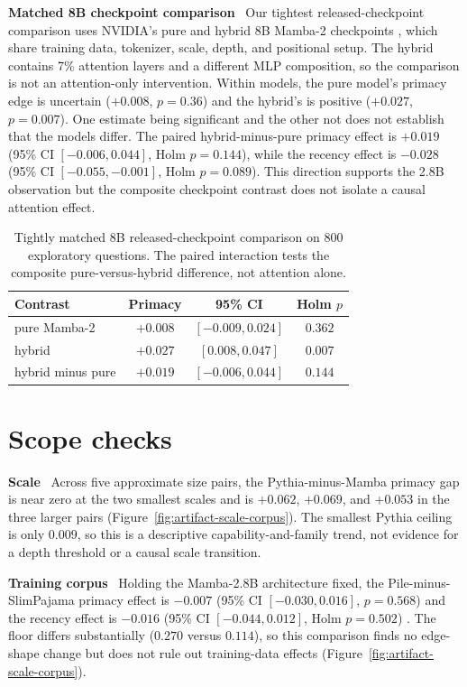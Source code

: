 \documentclass{article}
\newcommand{\runin}[1]{\par\medskip\noindent\textbf{#1}\ }
\begin{document}
\runin{Matched 8B checkpoint comparison}
Our tightest released-checkpoint comparison uses NVIDIA's pure and hybrid 8B Mamba-2 checkpoints \citep{waleffe2024empirical}, which share training data, tokenizer, scale, depth, and positional setup.
The hybrid contains 7\% attention layers and a different MLP composition, so the comparison is not an attention-only intervention.
Within models, the pure model's primacy edge is uncertain ($+0.008$, $p=0.36$) and the hybrid's is positive ($+0.027$, $p=0.007$).
One estimate being significant and the other not does not establish that the models differ.
The paired hybrid-minus-pure primacy effect is $+0.019$ (95\% CI $[-0.006,0.044]$, Holm $p=0.144$), while the recency effect is $-0.028$ (95\% CI $[-0.055,-0.001]$, Holm $p=0.089$).
This direction supports the 2.8B observation but the composite checkpoint contrast does not isolate a causal attention effect.

\begin{table}[t]
\caption{Tightly matched 8B released-checkpoint comparison on 800 exploratory questions.
The paired interaction tests the composite pure-versus-hybrid difference, not attention alone.}
\label{tab:phase3}
\centering
\small
\begin{tabular}{lccc}
\toprule
Contrast & Primacy & 95\% CI & Holm $p$ \\
\midrule
pure Mamba-2 & $+0.008$ & $[-0.009,0.024]$ & $0.362$ \\
hybrid & $+0.027$ & $[0.008,0.047]$ & $0.007$ \\
hybrid minus pure & $+0.019$ & $[-0.006,0.044]$ & $0.144$ \\
\bottomrule
\end{tabular}
\end{table}

\section{Scope checks}
\label{sec:robust}

\runin{Scale}
Across five approximate size pairs, the Pythia-minus-Mamba primacy gap is near zero at the two smallest scales and is $+0.062$, $+0.069$, and $+0.053$ in the three larger pairs (Figure~\ref{fig:artifact-scale-corpus}).
The smallest Pythia ceiling is only $0.009$, so this is a descriptive capability-and-family trend, not evidence for a depth threshold or a causal scale transition.

\runin{Training corpus}
Holding the Mamba-2.8B architecture fixed, the Pile-minus-SlimPajama primacy effect is $-0.007$ (95\% CI $[-0.030,0.016]$, $p=0.568$) and the recency effect is $-0.016$ (95\% CI $[-0.044,0.012]$, Holm $p=0.502$) \citep{soboleva2023slimpajama}.
The floor differs substantially ($0.270$ versus $0.114$), so this comparison finds no edge-shape change but does not rule out training-data effects (Figure~\ref{fig:artifact-scale-corpus}).
\end{document}

